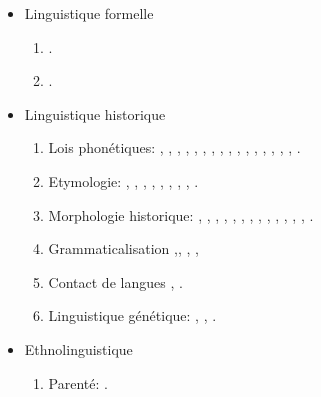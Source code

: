 \documentclass[oldfontcommands,oneside,a4paper,11pt]{article}
\newcommand{\langue}[2]{#2}
\begin{document}
\begin{itemize}
\item \langue{Formal linguistics}{Linguistique formelle}
\begin{enumerate}
\item \citet{walther14inv.canon}.
\item \citet{walther14compactness}.
\end{enumerate}

\item \langue{Historical linguistics}{Linguistique historique}
\begin{enumerate}
\item \langue{Sound laws}{Lois phonétiques}:  \citet{jacques00ywij}, \citet{jacques01dg}, \citet{jacques03dissimilation},   \citet{jacques04thimphu}, \citet{jacques06comparaison}, \citet{jacques09wazur}, \citet{jacques09e}, \citet{michaud10bonin}, \citet{jacques10ndr}, \citet{jacques.michaud11naish},   \citet{rg-gj12yod}, \citet{jacques13arapaho}, \citet{jacques13yod}, \citet{jacques14snom},   \citet{jacques14esquisse}, \citet{jacques14cone}, \citet{jacques16ebde}.
\item  \langue{Etymology}{Etymologie}:    \citet{jacques07naksatram}, \citet{jacques08debther}, \citet{jacques09zz}, \citet{jacques10imperial}, \citet{jacques11ngwemi}, \citet{jacques12bear},  \citet{jacques13vama},   \citet{jacques14esquisse}, \citet{jacques15sr}.
\item \langue{Historical morphology}{Morphologie historique}:  \citet{jacques03s.houzhui}, \citet{jacques06morpho}, \citet{jacques07chang},    \citet{jacques09tangutverb}, \citet{jacques10zos}, \citet{jacques11tangut.verb}, \citet{jacques12agreement}, \citet{jacques12internal}, \citet{jacques14antipassive},   \citet{jacques14esquisse}, \citet{jacques14cone}, \citet{jacques15derivational.khaling}, \citet{jacques15causative}, \citet{jacques16ebde}.
\item \langue{Grammaticalization:}{Grammaticalisation} \citet{jacques12internal},\citet{jacques13harmonization}, \citet{jacques14antipassive}, \citet{jacques14ergative}, \citet{jacques15comparative}
\item \langue{Language contact:}{Contact de langues} \citet{antonov12kumush},   \citet{jacques12bear}.
\item \langue{Genetic linguistics}{Linguistique génétique}:  \citet{jacques07chang}, \citet{jacques12agreement}, \citet{jacques2015genetic}.
\end{enumerate}
\item \langue{Ethnolinguistics}{Ethnolinguistique}
\begin{enumerate}
\item \langue{Kinship}{Parenté}: \citet{jacques11kinship}. 

\end{enumerate}
  
  
\end{itemize}




\end{document}
